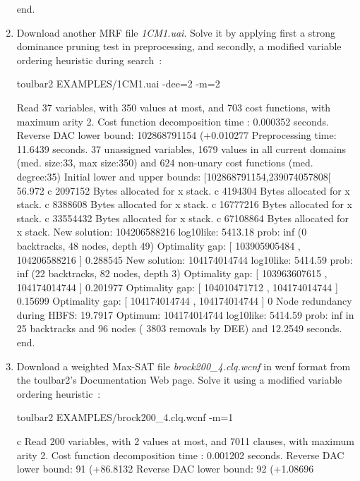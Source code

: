 \begin{enumerate}
{\begin{DoxyCode}
end.
\end{DoxyCode}}
\item Download another MRF file {\em 1CM1.uai}. Solve it by applying first a strong dominance pruning test in preprocessing, and secondly, a modified variable ordering heuristic during search~\cite{Schiex14a}:
\begin{DoxyCode}
	toulbar2 EXAMPLES/1CM1.uai -dee=2 -m=2
\end{DoxyCode}
{\scriptsize
\begin{DoxyCode}
Read 37 variables, with 350 values at most, and 703 cost functions, with maximum arity 2.
Cost function decomposition time : 0.000352 seconds.
Reverse DAC lower bound: 102868791154 (+0.010277%
Preprocessing time: 11.6439 seconds.
37 unassigned variables, 1679 values in all current domains (med. size:33, max size:350) and 624 non-unary cost functions (med. degree:35)
Initial lower and upper bounds: [102868791154,239074057808[ 56.972%
c 2097152 Bytes allocated for x stack.
c 4194304 Bytes allocated for x stack.
c 8388608 Bytes allocated for x stack.
c 16777216 Bytes allocated for x stack.
c 33554432 Bytes allocated for x stack.
c 67108864 Bytes allocated for x stack.
New solution: 104206588216 log10like: 5413.18 prob: inf (0 backtracks, 48 nodes, depth 49)
Optimality gap: [ 103905905484 , 104206588216 ] 0.288545 %
New solution: 104174014744 log10like: 5414.59 prob: inf (22 backtracks, 82 nodes, depth 3)
Optimality gap: [ 103963607615 , 104174014744 ] 0.201977 %
Optimality gap: [ 104010471712 , 104174014744 ] 0.15699 %
Optimality gap: [ 104174014744 , 104174014744 ] 0 %
Node redundancy during HBFS: 19.7917 %
Optimum: 104174014744 log10like: 5414.59 prob: inf in 25 backtracks and 96 nodes ( 3803 removals by DEE) and 12.2549 seconds.
end.
\end{DoxyCode}}
\item Download a weighted Max-SAT file {\em brock200\_4.clq.wcnf} in wcnf format from the toulbar2's Documentation Web page. Solve it using a modified variable ordering heuristic~\cite{Schiex14a}:
\begin{DoxyCode}
	toulbar2 EXAMPLES/brock200_4.clq.wcnf -m=1
\end{DoxyCode}
{\scriptsize
\begin{DoxyCode}
c Read 200 variables, with 2 values at most, and 7011 clauses, with maximum arity 2.
Cost function decomposition time : 0.001202 seconds.
Reverse DAC lower bound: 91 (+86.8132%
Reverse DAC lower bound: 92 (+1.08696%

\end{DoxyCode}}
\end{enumerate}
